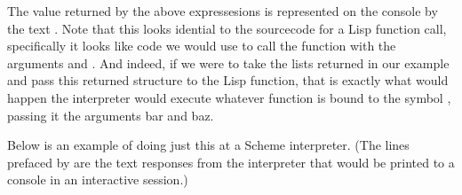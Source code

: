 \documentclass[letterpaper,10pt,english]{sphinxmanual}
\begin{document}
\begin{sphinxVerbatim}[commandchars=\\\{\}]
\end{sphinxVerbatim}

\sphinxAtStartPar
The value returned by the above expressesions is represented on the console by the text .
Note that this looks idential to the source\sphinxhyphen{}code for a Lisp function call,
specifically it looks like code we would use to call the function  with the arguments  and .
And indeed, if we were to take the lists returned in our example and pass this returned  structure
to the Lisp  function,
that is exactly what would happen \sphinxhyphen{} the interpreter would execute whatever function is bound to the symbol , passing
it the arguments bar and baz.

\sphinxAtStartPar
Below is an example of doing just this at a Scheme interpreter. (The lines prefaced by \sphinxstylestrong{\textgreater{}} are the text
responses from the interpreter that would be printed to a console in an interactive session.)

\begin{sphinxVerbatim}[commandchars=\\\{\}]
\end{sphinxVerbatim}
\end{document}
